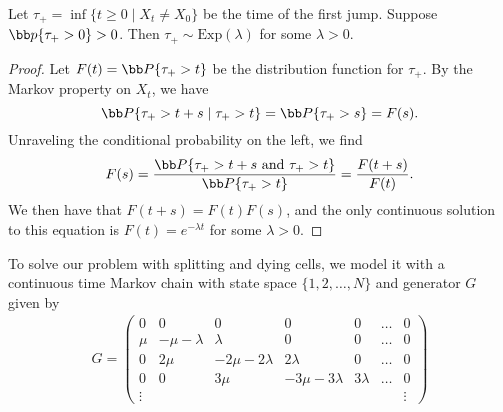 \documentclass[../../../Master/AppliedStochastics.tex]{subfiles}
\author{Andrew}
\date{2 November 2018}
\begin{document}
%


\makelecture


\begin{lemma}
	Let $\tau_+ = \inf\{ t\geq 0 \mid X_t \neq X_0\}$ be the time of the first 
	jump. Suppose $\bb p\{\tau_+ > 0\} >0$. Then $\tau_+ \sim 
	\text{Exp}(\lambda)$ 
	for some $\lambda>0$. 
\end{lemma}


\begin{proof}
	Let $F(t) = \bb P\{\tau_+ > t\}$ be the distribution function for $\tau_+$. 
	By 
	the Markov property on $X_t$, we have
	\[
		\bb P\{\tau_+ > t+s \mid \tau_+ > t\} = \bb P\{\tau_+ > s\} = F(s).
	\]
	Unraveling the conditional probability on the left, we find 
	\[
	F(s) = \frac{\bb P\{\tau_+>t+s \text{ and } \tau_+ > t\}}{\bb P\{\tau_+ > 
	t\}} = 
	\frac{F(t+s)}{F(t)}.
	\]
	We then have that $F(t+s) = F(t) F(s)$, and the only continuous solution to 
	this equation is $F(t) = e^{-\lambda t}$ for some $\lambda >0$.
	
\end{proof}

To solve our problem with splitting and dying cells, we model it with a 
continuous time Markov chain with state space $\{1, 2, \dots, N\}$ and 
generator $G$ given by
\begin{align*}
	G = \begin{pmatrix}
		0 & 0 & 0 & 0 & 0 &\dots & 0\\
		\mu & -\mu-\lambda & \lambda & 0 & 0 & \dots & 0\\
		0 & 2\mu & -2\mu-2\lambda & 2\lambda & 0 & \dots & 0\\
		0 & 0 & 3\mu & -3\mu-3\lambda & 3\lambda & \dots & 0 \\
		\vdots & & & & & & \vdots 
	\end{pmatrix}
\end{align*}
\end{document}
